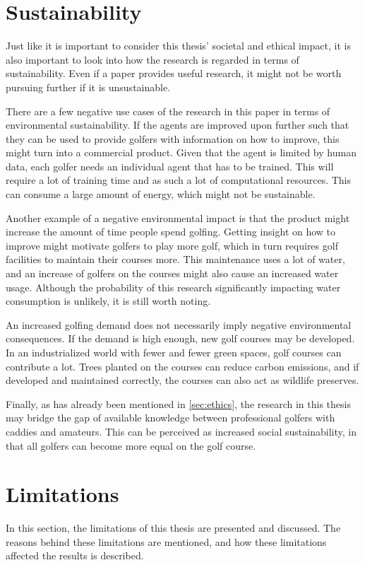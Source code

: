 \documentclass{kththesis}
\begin{document}
\section{Sustainability}
Just like it is important to consider this thesis' societal and ethical impact, it is also important to look into how the research is regarded in terms of sustainability. Even if a paper provides useful research, it might not be worth pursuing further if it is unsustainable.

There are a few negative use cases of the research in this paper in terms of environmental sustainability. If the agents are improved upon further such that they can be used to provide golfers with information on how to improve, this might turn into a commercial product. Given that the agent is limited by human data, each golfer needs an individual agent that has to be trained. This will require a lot of training time and as such a lot of computational resources. This can consume a large amount of energy, which might not be sustainable. 

Another example of a negative environmental impact is that the product might increase the amount of time people spend golfing. Getting insight on how to improve might motivate golfers to play more golf, which in turn requires golf facilities to maintain their courses more. This maintenance uses a lot of water, and an increase of golfers on the courses might also cause an increased water usage. Although the probability of this research significantly impacting water consumption is unlikely, it is still worth noting. 

An increased golfing demand does not necessarily imply negative environmental consequences. If the demand is high enough, new golf courses may be developed. In an industrialized world with fewer and fewer green spaces, golf courses can contribute a lot. Trees planted on the courses can reduce carbon emissions, and if developed and maintained correctly, the courses can also act as wildlife preserves. 

Finally, as has already been mentioned in \autoref{sec:ethics}, the research in this thesis may bridge the gap of available knowledge between professional golfers with caddies and amateurs. This can be perceived as increased social sustainability, in that all golfers can become more equal on the golf course. 

\section{Limitations}
In this section, the limitations of this thesis are presented and discussed. The reasons behind these limitations are mentioned, and how these limitations affected the results is described.
\end{document}
